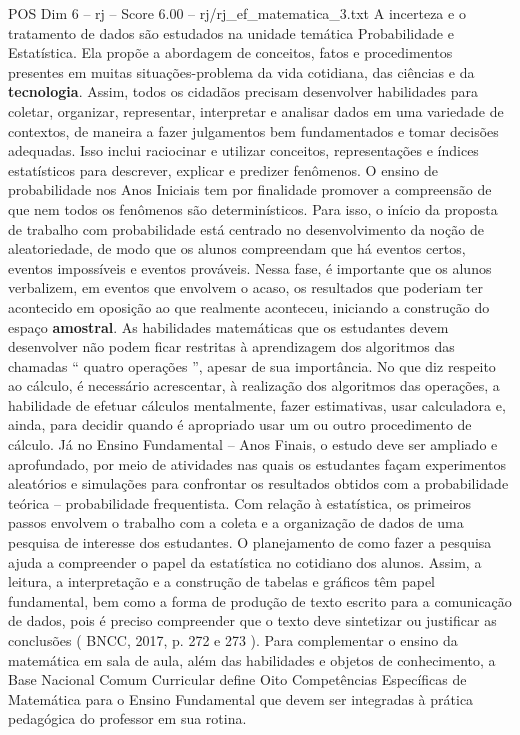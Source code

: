 \begin{textsample}{POS Dim 6 – rj – Score 6.00 – rj/rj\_ef\_matematica\_3.txt}  \label{ex:f6_pos_279}
A incerteza e o tratamento de dados são estudados na unidade temática Probabilidade e Estatística.
Ela propõe a abordagem de conceitos, fatos e procedimentos presentes em muitas situações-problema da vida cotidiana, das ciências e da \textbf{tecnologia}.
Assim, todos os cidadãos precisam desenvolver habilidades para coletar, organizar, representar, interpretar e analisar dados em uma variedade de contextos, de maneira a fazer julgamentos bem fundamentados e tomar decisões adequadas.
Isso inclui raciocinar e utilizar conceitos, representações e índices estatísticos para descrever, explicar e predizer fenômenos.
O ensino de probabilidade nos Anos Iniciais tem por finalidade promover a compreensão de que nem todos os fenômenos são determinísticos.
Para isso, o início da proposta de trabalho com probabilidade está centrado no desenvolvimento da noção de aleatoriedade, de modo que os alunos compreendam que há eventos certos, eventos impossíveis e eventos prováveis.
Nessa fase, é importante que os alunos verbalizem, em eventos que envolvem o acaso, os resultados que poderiam ter acontecido em oposição ao que realmente aconteceu, iniciando a construção do espaço \textbf{amostral}.
As habilidades matemáticas que os estudantes devem desenvolver não podem ficar restritas à aprendizagem dos algoritmos das chamadas “ quatro operações ”, apesar de sua importância.
No que diz respeito ao cálculo, é necessário acrescentar, à realização dos algoritmos das operações, a habilidade de efetuar cálculos mentalmente, fazer estimativas, usar calculadora e, ainda, para decidir quando é apropriado usar um ou outro procedimento de cálculo.
Já no Ensino Fundamental – Anos Finais, o estudo deve ser ampliado e aprofundado, por meio de atividades nas quais os estudantes façam experimentos aleatórios e simulações para confrontar os resultados obtidos com a probabilidade teórica – probabilidade frequentista.
Com relação à estatística, os primeiros passos envolvem o trabalho com a coleta e a organização de dados de uma pesquisa de interesse dos estudantes.
O planejamento de como fazer a pesquisa ajuda a compreender o papel da estatística no cotidiano dos alunos.
Assim, a leitura, a interpretação e a construção de tabelas e gráficos têm papel fundamental, bem como a forma de produção de texto escrito para a comunicação de dados, pois é preciso compreender que o texto deve sintetizar ou justificar as conclusões ( BNCC, 2017, p. 272 e 273 ).
Para complementar o ensino da matemática em sala de aula, além das habilidades e objetos de conhecimento, a Base Nacional Comum Curricular define Oito Competências Específicas de Matemática para o Ensino Fundamental que devem ser integradas à prática pedagógica do professor em sua rotina.

\end{textsample}
